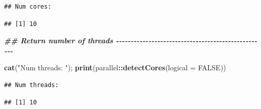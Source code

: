 \documentclass[
  11pt,
]{article}
\newenvironment{Shaded}{\begin{snugshade}}{\end{snugshade}}
\newcommand{\AttributeTok}[1]{\textcolor[rgb]{0.13,0.29,0.53}{#1}}
\newcommand{\ConstantTok}[1]{\textcolor[rgb]{0.56,0.35,0.01}{#1}}
\newcommand{\DocumentationTok}[1]{\textcolor[rgb]{0.56,0.35,0.01}{\textbf{\textit{#1}}}}
\newcommand{\FunctionTok}[1]{\textcolor[rgb]{0.13,0.29,0.53}{\textbf{#1}}}
\newcommand{\NormalTok}[1]{#1}
\newcommand{\SpecialCharTok}[1]{\textcolor[rgb]{0.81,0.36,0.00}{\textbf{#1}}}
\newcommand{\StringTok}[1]{\textcolor[rgb]{0.31,0.60,0.02}{#1}}
\begin{document}
\begin{verbatim}
## Num cores:
\end{verbatim}

\begin{verbatim}
## [1] 10
\end{verbatim}

\begin{Shaded}
\begin{Highlighting}[]
\DocumentationTok{\#\# Return number of threads {-}{-}{-}{-}{-}{-}{-}{-}{-}{-}{-}{-}{-}{-}{-}{-}{-}{-}{-}{-}{-}{-}{-}{-}{-}{-}{-}{-}{-}{-}{-}{-}{-}{-}{-}{-}{-}{-}{-}{-}{-}{-}{-}{-}{-}{-}{-}{-}{-}{-}{-}}

\FunctionTok{cat}\NormalTok{(}\StringTok{"Num threads: "}\NormalTok{); }\FunctionTok{print}\NormalTok{(parallel}\SpecialCharTok{::}\FunctionTok{detectCores}\NormalTok{(}\AttributeTok{logical =} \ConstantTok{FALSE}\NormalTok{))}
\end{Highlighting}
\end{Shaded}

\begin{verbatim}
## Num threads:
\end{verbatim}

\begin{verbatim}
## [1] 10
\end{verbatim}
\end{document}
